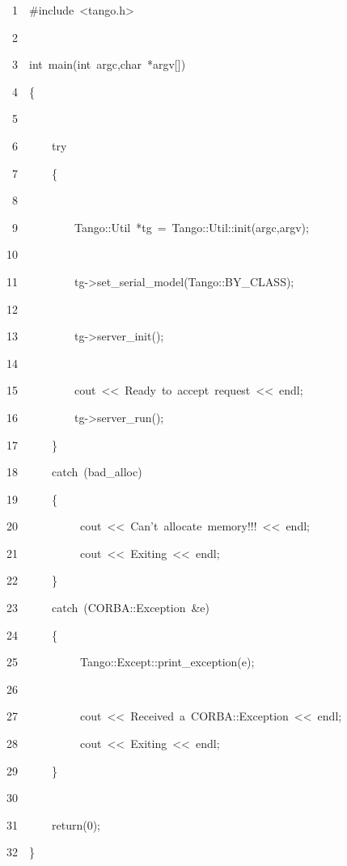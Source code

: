 
\begin{lyxcode}
~~~~~1~~\#include~<tango.h>

~~~~~2~~

~~~~~3~~int~main(int~argc,char~{*}argv{[}{]})

~~~~~4~~\{

~~~~~5~~

~~~~~6~~~~~~try

~~~~~7~~~~~~\{

~~~~~8~~~~~~~~~~

~~~~~9~~~~~~~~~~Tango::Util~{*}tg~=~Tango::Util::init(argc,argv);

~~~~10~~

~~~~11~~~~~~~~~~tg->set\_serial\_model(Tango::BY\_CLASS);

~~~~12~~

~~~~13~~~~~~~~~~tg->server\_init();

~~~~14~~

~~~~15~~~~~~~~~~cout~<\textcompwordmark{}<~\textquotedbl{}Ready~to~accept~request\textquotedbl{}~<\textcompwordmark{}<~endl;

~~~~16~~~~~~~~~~tg->server\_run();

~~~~17~~~~~~\}

~~~~18~~~~~~catch~(bad\_alloc)

~~~~19~~~~~~\{

~~~~20~~~~~~~~~~~cout~<\textcompwordmark{}<~\textquotedbl{}Can't~allocate~memory!!!\textquotedbl{}~<\textcompwordmark{}<~endl;

~~~~21~~~~~~~~~~~cout~<\textcompwordmark{}<~\textquotedbl{}Exiting\textquotedbl{}~<\textcompwordmark{}<~endl;

~~~~22~~~~~~\}

~~~~23~~~~~~catch~(CORBA::Exception~\&e)

~~~~24~~~~~~\{

~~~~25~~~~~~~~~~~Tango::Except::print\_exception(e);

~~~~26~~~~~~~~~~~~~~~~~~

~~~~27~~~~~~~~~~~cout~<\textcompwordmark{}<~\textquotedbl{}Received~a~CORBA::Exception\textquotedbl{}~<\textcompwordmark{}<~endl;

~~~~28~~~~~~~~~~~cout~<\textcompwordmark{}<~\textquotedbl{}Exiting\textquotedbl{}~<\textcompwordmark{}<~endl;

~~~~29~~~~~~\}

~~~~30~~~~~~~~~~

~~~~31~~~~~~return(0);

~~~~32~~\}

\end{lyxcode}



